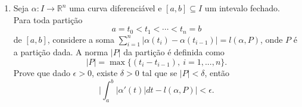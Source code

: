 \documentclass[12pt,a4paper,oneside]{book}
\newcommand{\R}{\mathbb{R}}%
\begin{document}
\begin{enumerate}
\item Seja $\alpha\colon I\to \R^n$ uma curva diferenci\'avel e $[a,b]\subseteq I$ um intevalo fechado.
	Para toda parti\c c\~ao $$a=t_0<t_1<\cdots <t_n=b$$
	de $[a,b]$, considere a soma
	$\sum_{i=1}^n|\alpha(t_i)-\alpha(t_{i-1})| = l(\alpha,P)$, onde $P$ \'e a parti\c c\~ao dada.
	A norma $|P|$ da parti\c c\~ao \'e definida como
	$$|P|=\max\{(t_i-t_{i-1}), \ i=1,...,n\}.$$
	Prove que dado $\epsilon >0$, existe $\delta >0$ tal que se $|P|<\delta$, ent\~ao
	$$\Big|\int_a^b|\alpha'(t)|dt-l(\alpha,P)\Big|<\epsilon.$$
	
	
	






\end{enumerate}
\end{document}
